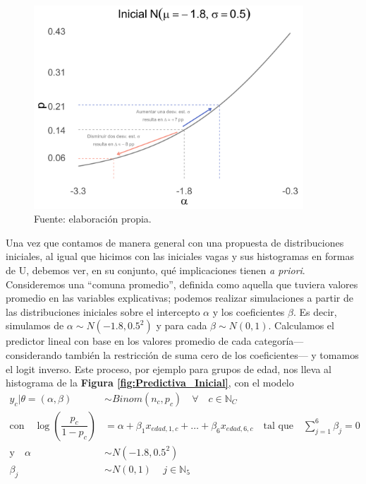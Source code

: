 \begin{figure}[h]
	\centering
	\includegraphics[width = 0.9\textwidth]{Figs/Modelado/Inicial_N0_un_medio}
	\caption{Fuente: elaboración propia.}
	\label{fig:Inicial_Alfa}
\end{figure}

Una vez que contamos de manera general con una propuesta de distribuciones iniciales, al igual que hicimos con las iniciales vagas y sus histogramas en formas de U, debemos ver, en su conjunto, qué implicaciones tienen \textit{a priori}. Consideremos una ``comuna promedio'', definida como aquella que tuviera valores promedio en las variables explicativas; podemos realizar simulaciones a partir de las distribuciones iniciales sobre el intercepto $\alpha$ y los coeficientes $\beta$. Es decir, simulamos de $\alpha\sim N(-1.8,0.5^2)$ y para cada $\beta\sim N(0,1)$. Calculamos el predictor lineal con base en los valores promedio de cada categoría--- considerando también la restricción de suma cero de los coeficientes--- y tomamos el logit inverso. Este proceso, por ejemplo para grupos de edad, nos lleva al histograma de la \textbf{Figura \ref{fig:Predictiva_Inicial}}, con el modelo
\begin{align*}
y_c|\theta=(\alpha,\beta) & \sim Binom(n_c,p_c) \quad \forall \quad c \in \mathbb{N}_C \\
\text{con} \quad \log\left(\dfrac{p_c}{1-p_c}\right) &= \alpha + \beta_1 x_{edad,1,c} + \dots + \beta_6 x_{edad,6,c} \quad \text{tal que} \quad \sum\limits_{j = 1}^6 \beta_j = 0 \nonumber \\
\text{y} \quad \alpha & \sim N(-1.8,0.5^2)\\
\beta_j & \sim N(0,1) \quad \, j \in \mathbb{N}_{5} 
\end{align*}

